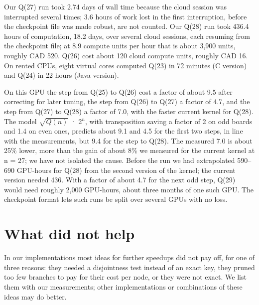 Our Q(27) run took 2.74 days of wall time because the cloud session was interrupted several times; 3.6 hours of work lost in the first interruption, before the checkpoint file was made robust, are not counted. Our Q(28) run took 436.4 hours of computation, 18.2 days, over several cloud sessions, each resuming from the checkpoint file; at 8.9 compute units per hour that is about 3,900 units, roughly CAD 520. Q(26) cost about 120 cloud compute units, roughly CAD 16. On rented CPUs, eight virtual cores computed Q(23) in 72 minutes (C version) and Q(24) in 22 hours (Java version).

On this GPU the step from Q(25) to Q(26) cost a factor of about 9.5 after correcting for later tuning, the step from Q(26) to Q(27) a factor of 4.7, and the step from Q(27) to Q(28) a factor of 7.0, with the faster current kernel for Q(28). The model $\sqrt{Q(n)}$ · 2$^{n}$, with transposition saving a factor of 2 on odd boards and 1.4 on even ones, predicts about 9.1 and 4.5 for the first two steps, in line with the measurements, but 9.4 for the step to Q(28). The measured 7.0 is about 25\% lower, more than the gain of about 8\% we measured for the current kernel at n = 27; we have not isolated the cause. Before the run we had extrapolated 590–690 GPU-hours for Q(28) from the second version of the kernel; the current version needed 436. With a factor of about 4.7 for the next odd step, Q(29) would need roughly 2,000 GPU-hours, about three months of one such GPU. The checkpoint format lets such runs be split over several GPUs with no loss.

\section{What did not help}

In our implementations most ideas for further speedups did not pay off, for one of three reasons: they needed a disjointness test instead of an exact key, they pruned too few branches to pay for their cost per node, or they were not exact. We list them with our measurements; other implementations or combinations of these ideas may do better.

